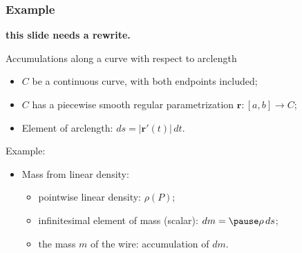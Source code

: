 \begin{frame}
  \frametitle{Example}
\textbf{this slide needs a rewrite.}  
  
  Accumulations along a curve \textcolor[rgb]{0.98,0.00,0.00}{with respect to arclength}

  \begin{itemize}
    \item $C$ be a continuous curve, with both endpoints included;
    \item $C$ has a piecewise smooth regular parametrization $\textbf{r}\colon [a,b]\to C$;
    \item Element of arclength: $ds= |\textbf{r}'(t)|\, dt$.
  \end{itemize}

\pause   Example:
  \begin{itemize}
    \item Mass from linear density:
    \begin{itemize}
      \item \pause pointwise linear density: $\rho(P)$;
      \item \pause infinitesimal element of mass (scalar): $dm = \pause \rho\, ds$;
      \item \pause the mass $m$ of the wire: accumulation of $dm$.
    \end{itemize}
  \end{itemize}
\end{frame}